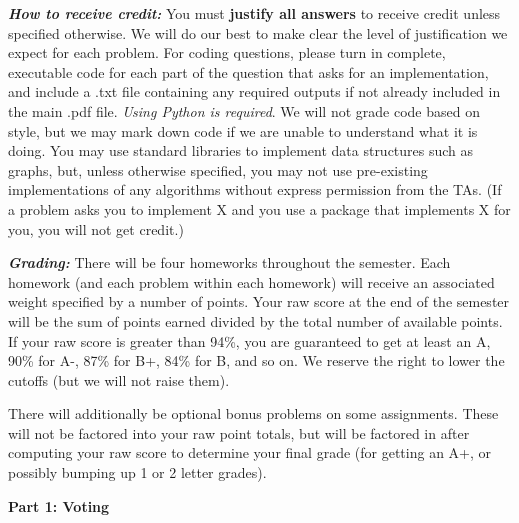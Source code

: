 \documentclass[11pt,letterpaper]{article}
\theoremstyle{definition}
\begin{document}
\begin{footnotesize}
\emph{\textbf{How to receive credit:}}
You must \textbf{justify all answers} to receive credit unless specified otherwise. We will do our best to make clear the level of justification we expect for each problem.
For coding questions, please turn in complete, executable code for each part of the question that asks 
for an implementation, and include a .txt file containing any required outputs if not already included in 
the main .pdf file. 
\emph{Using Python is required}. We will not grade code based on style, but we may mark down code if we are 
unable to understand what it is doing. You may use standard libraries to implement data structures 
such as graphs, but, unless otherwise specified, you may not use pre-existing implementations of any 
algorithms without express permission from the TAs. (If a problem asks you to implement X and you use a package that implements X for you, you will not get credit.)

\emph{\textbf{Grading:}} There will be four homeworks throughout the semester. Each homework (and each problem within each homework) will receive an associated weight specified by a number of points. Your raw score at the end of the semester will be the sum of points earned divided by the total number of available points. 
If your raw score is greater than 94\%, you are guaranteed to get at least an A, 90\% for A-, 87\% for B+, 84\% for B, and so on.
We reserve the right to lower the cutoffs (but we will not raise them).

There will additionally be optional bonus problems on some assignments. These will not be factored into your raw point totals, but will be factored in after computing your raw score to determine your final grade (for getting an A+, or possibly bumping up 1 or 2 letter grades).

\end{footnotesize}

\fi

\newpage






\noindent
{\Large\textbf{Part 1: Voting}\par}
\end{document}
